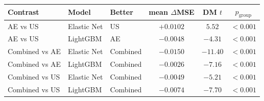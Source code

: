 \begin{tabular}{lllccc}
\toprule
Contrast & Model & Better & mean $\Delta$MSE & DM $t$ & $p_{\mathrm{group}}$ \\
\midrule
AE vs US & Elastic Net & US & $+0.0102$ & $5.52$ & $<0.001$ \\
AE vs US & LightGBM & AE & $-0.0048$ & $-4.31$ & $<0.001$ \\
Combined vs AE & Elastic Net & Combined & $-0.0150$ & $-11.40$ & $<0.001$ \\
Combined vs AE & LightGBM & Combined & $-0.0026$ & $-7.16$ & $<0.001$ \\
Combined vs US & Elastic Net & Combined & $-0.0049$ & $-5.21$ & $<0.001$ \\
Combined vs US & LightGBM & Combined & $-0.0074$ & $-7.70$ & $<0.001$ \\
\bottomrule
\end{tabular}
